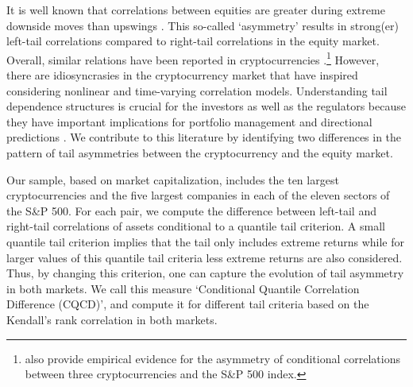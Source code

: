 \documentclass{article}
\begin{document}
It is well known that correlations between equities are greater during extreme downside moves than upswings \citep{longin2001, ang2002asymmetric}. This so-called `asymmetry' results in strong(er) left-tail correlations compared to right-tail correlations in the equity market. Overall, similar relations have been reported in cryptocurrencies \citep{feng2018, li2022}.\footnote{\cite{ahn2022} also provide empirical evidence for the asymmetry of conditional correlations between three cryptocurrencies and the S\&P 500 index.} However, there are idiosyncrasies in the cryptocurrency market that have inspired considering nonlinear \citep{li2022} and time-varying \citep{aslanidis2019, wang2022} correlation models. Understanding tail dependence structures is crucial for the investors as well as the regulators because they have important implications for portfolio management \cite{sleire2022portfolio} and directional predictions \cite{bekiros2021}. We contribute to this literature by identifying two differences in the pattern of tail asymmetries between the cryptocurrency and the equity market.\par

Our sample, based on market capitalization, includes the ten largest cryptocurrencies and the five largest companies in each of the eleven sectors of the S\&P 500. For each pair, we compute the difference between left-tail and right-tail correlations of assets conditional to a quantile tail criterion. A small quantile tail criterion implies that the tail only includes extreme returns while for larger values of this quantile tail criteria less extreme returns are also considered. Thus, by changing this criterion, one can capture the evolution of tail asymmetry in both markets. We call this measure `Conditional Quantile Correlation Difference (CQCD)', and compute it for different tail criteria based on the Kendall's rank correlation in both markets.\par 
\end{document}
